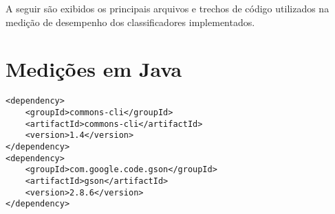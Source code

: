 A seguir são exibidos os principais arquivos e trechos de código utilizados na medição de desempenho dos classificadores implementados.

\section{Medições em Java}

\begin{lstlisting}[caption=Dependências Maven comuns a todas medições em Java]
<dependency>
    <groupId>commons-cli</groupId>
    <artifactId>commons-cli</artifactId>
    <version>1.4</version>
</dependency>
<dependency>
    <groupId>com.google.code.gson</groupId>
    <artifactId>gson</artifactId>
    <version>2.8.6</version>
</dependency>
\end{lstlisting}

